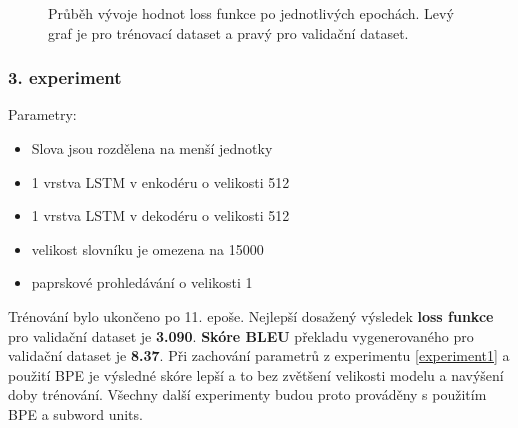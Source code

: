 \begin{figure}[H]
    \begin{center}
    \end{center}
	\caption{Průběh vývoje hodnot loss funkce po jednotlivých epochách. Levý graf je pro trénovací dataset a pravý pro validační dataset.}
\end{figure}


\subsubsection{3. experiment}\label{experiment3}
Parametry:
\begin{itemize}
  \item Slova jsou rozdělena na menší jednotky
  \item 1 vrstva LSTM v enkodéru o velikosti 512
  \item 1 vrstva LSTM v dekodéru o velikosti 512
  \item velikost slovníku je omezena na 15000
  \item paprskové prohledávání o velikosti 1
\end{itemize}

Trénování bylo ukončeno po 11. epoše. Nejlepší dosažený výsledek \textbf{loss funkce} pro validační dataset je \textbf{3.090}. \textbf{Skóre BLEU} překladu vygenerovaného pro validační dataset je \textbf{8.37}. Při zachování parametrů z experimentu \ref{experiment1} a použití BPE je výsledné skóre lepší a to bez zvětšení velikosti modelu a navýšení doby trénování. Všechny další experimenty budou proto prováděny s použitím BPE a subword units.

